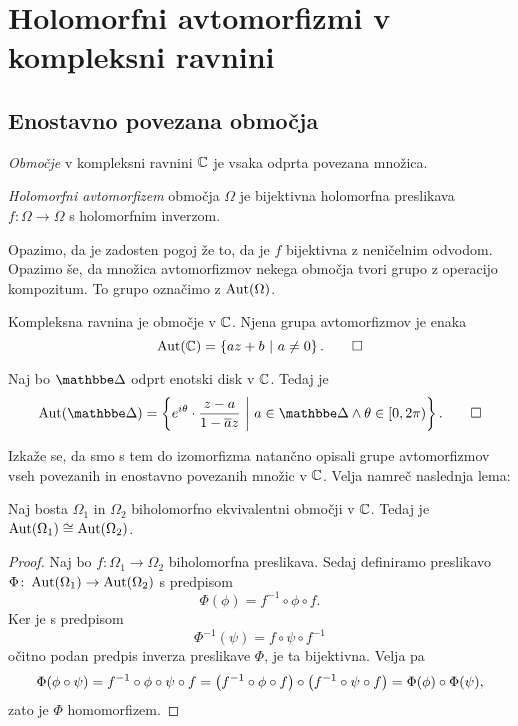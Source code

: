 \section{Holomorfni avtomorfizmi v kompleksni ravnini}

\subsection{Enostavno povezana območja}

\begin{definicija}
\emph{Območje} v kompleksni ravnini $\mathbb{C}$ je vsaka odprta povezana
množica.
\end{definicija}

\begin{definicija}
\emph{Holomorfni avtomorfizem} območja $\Omega$ je bijektivna
holomorfna preslikava $f \colon \Omega \to \Omega$ s holomorfnim
inverzom.
\end{definicija}

Opazimo, da je zadosten pogoj že to, da je $f$ bijektivna z
neničelnim odvodom. Opazimo še, da množica avtomorfizmov nekega
območja tvori grupo z operacijo kompozitum. To grupo označimo z
$\operatorname{Aut}(\Omega)$.

\begin{primer}
Kompleksna ravnina je območje v $\mathbb{C}$. Njena grupa avtomorfizmov
je enaka
\[
\operatorname{Aut}(\mathbb{C}) = \left\{az + b~\middle\vert~a \ne 0\right\}. \qedhere
\]
\end{primer}

\begin{primer}
Naj bo $\dsk$ odprt enotski disk v $\mathbb{C}$. Tedaj je
\[
\Aut(\dsk) =
\setb{e^{i \theta} \cdot \frac{z-a}{1 - \oline{a} z}}
{a \in \dsk \land \theta \in [0, 2\pi)}. \qedhere
\]
\end{primer}

Izkaže se, da smo s tem do izomorfizma natančno opisali grupe
avtomorfizmov vseh povezanih in enostavno povezanih množic v $\mathbb{C}$.
Velja namreč naslednja lema:

\begin{lema}
Naj bosta $\Omega_1$ in $\Omega_2$ biholomorfno ekvivalentni
območji v $\mathbb{C}$. Tedaj je $\operatorname{Aut}(\Omega_1) \cong \operatorname{Aut}(\Omega_2)$.
\end{lema}

\begin{proof}
Naj bo $f \colon \Omega_1 \to \Omega_2$ biholomorfna preslikava.
Sedaj definiramo preslikavo
$\Phi \colon \operatorname{Aut}(\Omega_1) \to \operatorname{Aut}(\Omega_2)$ s predpisom
\[
\Phi(\phi) = f^{-1} \circ \phi \circ f.
\]
Ker je s predpisom
\[
\Phi^{-1}(\psi) = f \circ \psi \circ f^{-1}
\]
očitno podan predpis inverza preslikave $\Phi$, je ta bijektivna.
Velja pa
\[
\Phi(\phi \circ \psi) = f^{-1} \circ \phi \circ \psi \circ f =
\left(f^{-1} \circ \phi \circ f\right) \circ
\left(f^{-1} \circ \psi \circ f\right) =
\Phi(\phi) \circ \Phi(\psi),
\]
zato je $\Phi$ homomorfizem.
\end{proof}

